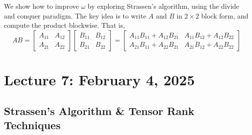         \\
        \\
        We show how to improve \(\omega\) by exploring Strassen's algorithm, using the divide and conquer paradigm. The key idea is to write \(A\) and \(B\) in \(2\times 2\) block form, and compute the product blockwise. That is, 
        \begin{equation*}
            AB=\begin{bmatrix}
                A_{11} & A_{12} \\
                A_{21} & A_{22}
            \end{bmatrix}
            \begin{bmatrix}
                B_{11} & B_{12} \\
                B_{21} & B_{22}
            \end{bmatrix}=
            \begin{bmatrix}
                A_{11}B_{11}+A_{12}B_{21} & A_{11}B_{12}+A_{12}B_{22} \\
                A_{21}B_{11}+A_{22}B_{21} & A_{21}B_{12}+A_{22}B_{22} 
            \end{bmatrix}
        \end{equation*}
        
        
\pagebreak

\section{Lecture 7: February 4, 2025}

    \subsection{Strassen's Algorithm \& Tensor Rank Techniques}

